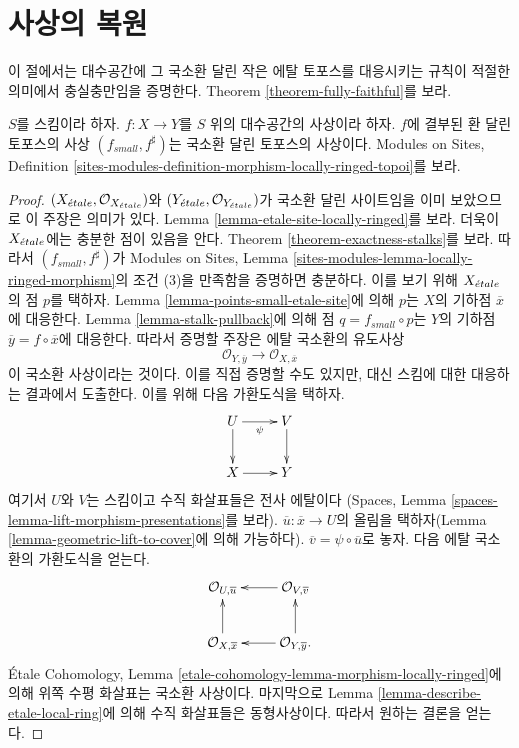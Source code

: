 \section{사상의 복원}
\label{section-morphisms}

\noindent
이 절에서는 대수공간에 그 국소환 달린 작은 에탈 토포스를 대응시키는
규칙이 적절한 의미에서 충실충만임을 증명한다. Theorem
\ref{theorem-fully-faithful}를 보라.

\begin{lemma}
\label{lemma-morphism-locally-ringed}
$S$를 스킴이라 하자.
$f : X \to Y$를 $S$ 위의 대수공간의 사상이라 하자.
$f$에 결부된 환 달린 토포스의 사상 $(f_{small}, f^\sharp)$는
국소환 달린 토포스의 사상이다. Modules on Sites, Definition
\ref{sites-modules-definition-morphism-locally-ringed-topoi}를 보라.
\end{lemma}

\begin{proof}
$(X_{\acute{e}tale}, \mathcal{O}_{X_{\acute{e}tale}})$와
$(Y_{\acute{e}tale}, \mathcal{O}_{Y_{\acute{e}tale}})$가 국소환 달린 사이트임을 이미
보았으므로 이 주장은 의미가 있다. Lemma
\ref{lemma-etale-site-locally-ringed}를 보라. 더욱이
$X_{\acute{e}tale}$에는 충분한 점이 있음을 안다. Theorem
\ref{theorem-exactness-stalks}를 보라. 따라서 $(f_{small}, f^\sharp)$가
Modules on Sites, Lemma
\ref{sites-modules-lemma-locally-ringed-morphism}의 조건 (3)을 만족함을
증명하면 충분하다. 이를 보기 위해 $X_{\acute{e}tale}$의 점 $p$를 택하자.
Lemma \ref{lemma-points-small-etale-site}에 의해 $p$는 $X$의 기하점
$\overline{x}$에 대응한다. Lemma \ref{lemma-stalk-pullback}에 의해
점 $q = f_{small} \circ p$는 $Y$의 기하점
$\overline{y} = f \circ \overline{x}$에 대응한다. 따라서 증명할 주장은
에탈 국소환의 유도사상
$$
\mathcal{O}_{Y, \overline{y}} \longrightarrow \mathcal{O}_{X, \overline{x}}
$$
이 국소환 사상이라는 것이다. 이를 직접 증명할 수도 있지만, 대신 스킴에
대한 대응하는 결과에서 도출한다. 이를 위해 다음 가환도식을 택하자.
$$
\xymatrix{
U \ar[d] \ar[r]_\psi & V \ar[d] \\
X \ar[r] & Y
}
$$
여기서 $U$와 $V$는 스킴이고 수직 화살표들은 전사 에탈이다
(Spaces, Lemma \ref{spaces-lemma-lift-morphism-presentations}를 보라).
$\overline{u} : \overline{x} \to U$의 올림을 택하자(Lemma
\ref{lemma-geometric-lift-to-cover}에 의해 가능하다).
$\overline{v} = \psi \circ \overline{u}$로 놓자. 다음 에탈 국소환의
가환도식을 얻는다.
$$
\xymatrix{
\mathcal{O}_{U, \overline{u}} &
\mathcal{O}_{V, \overline{v}} \ar[l] \\
\mathcal{O}_{X, \overline{x}} \ar[u] &
\mathcal{O}_{Y, \overline{y}}. \ar[l] \ar[u]
}
$$
\'Etale Cohomology, Lemma
\ref{etale-cohomology-lemma-morphism-locally-ringed}에 의해 위쪽 수평
화살표는 국소환 사상이다. 마지막으로 Lemma
\ref{lemma-describe-etale-local-ring}에 의해 수직 화살표들은
동형사상이다. 따라서 원하는 결론을 얻는다.
\end{proof}


